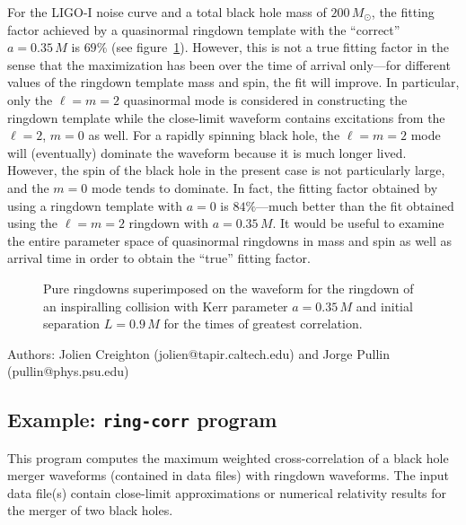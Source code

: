 For the LIGO-I noise curve and a total black hole mass of $200\,M_\odot$,
the fitting factor achieved by a quasinormal ringdown template with the
``correct'' $a=0.35\,M$ is $69\%$ (see figure~\ref{f:inspiral-fit}).  However,
this is not a true fitting factor in the sense that the maximization has been
over the time of arrival only---for different values of the ringdown template
mass and spin, the fit will improve.  In particular, only the $\ell=m=2$
quasinormal mode is considered in constructing the ringdown template while the
close-limit waveform contains excitations from the $\ell=2$, $m=0$ as well.
For a rapidly spinning black hole, the $\ell=m=2$ mode will (eventually)
dominate the waveform because it is much longer lived.  However, the spin of
the black hole in the present case is not particularly large, and the $m=0$
mode tends to dominate.  In fact, the fitting factor obtained by using a
ringdown template with $a=0$ is $84\%$---much better than the fit obtained
using the $\ell=m=2$ ringdown with $a=0.35\,M$.  It would be useful to examine
the entire parameter space of quasinormal ringdowns in mass and spin as well
as arrival time in order to obtain the ``true'' fitting factor.

\begin{figure}[h]
\begin{center}
\end{center}
\caption{\label{f:inspiral-fit}%
Pure ringdowns superimposed on the waveform for the ringdown of an
inspiralling collision with Kerr parameter $a=0.35\,M$ and initial separation
$L=0.9\,M$ for the times of greatest correlation.}
\end{figure}

\begin{description}
\item{Authors:}  Jolien Creighton (jolien@tapir.caltech.edu)
    and Jorge Pullin (pullin@phys.psu.edu)
\end{description}

\clearpage
\subsection{Example: \texttt{ring-corr} program}

This program computes the maximum weighted cross-correlation of a black hole
merger waveforms (contained in data files) with ringdown waveforms.  The input
data file(s) contain close-limit approximations or numerical relativity
results for the merger of two black holes.

